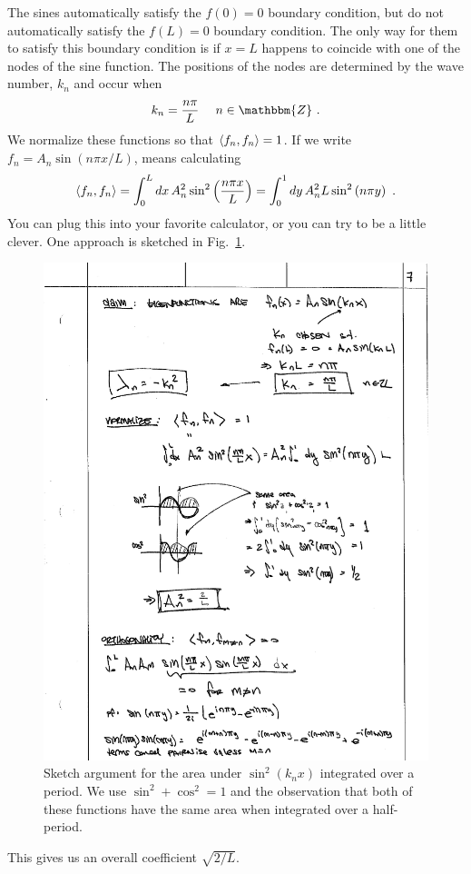 The sines automatically satisfy the $f(0)=0$ boundary condition, but do not automatically satisfy the $f(L)=0$ boundary condition. The only way for them to satisfy this boundary condition is if $x=L$ happens to coincide with one of the nodes of the sine function. The positions of the nodes are determined by the wave number, $k_n$ and occur when
\begin{align}
    k_n &= \frac{n\pi}{L} \ 
    &
    n\in \mathbbm{Z} \ .
\end{align}
We normalize these functions so that $\langle f_n, f_n \rangle = 1$. If we write $f_n = A_n\sin(n\pi x/L)$, means calculating
\begin{align}
    \langle f_n, f_n \rangle = 
    \int_0^L dx\, A_n^2 \sin^2\left(\frac{n\pi x}{L}\right)
    =
    \int_0^1 dy\, A_n^2 L \sin^2\left(n\pi y\right) \ .
\end{align}
You can plug this into your favorite calculator, or you can try to be a little clever. One approach is sketched in Fig.~\ref{fig:sinecosine:area}.
\begin{figure}[tb]
    \centering
    \includegraphics[width=.7\textwidth]{figures/sinecos_area.pdf}
    \caption{Sketch argument for the area under $\sin^2(k_n x)$ integrated over a period. We use $\sin^2 + \cos^2 = 1$ and the observation that both of these functions have the same area when integrated over a half-period.}
    \label{fig:sinecosine:area}
\end{figure}
This gives us an overall coefficient $\sqrt{2/L}$.

